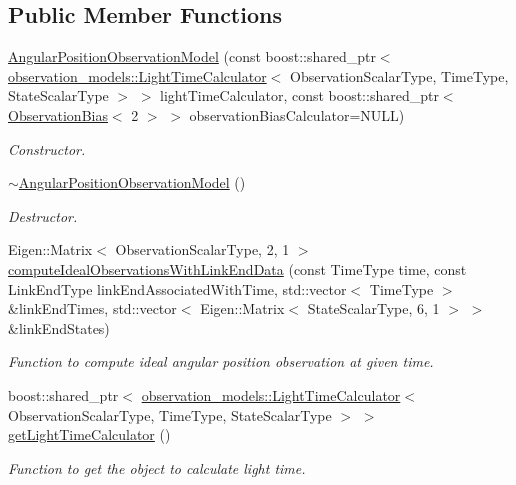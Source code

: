 \subsection*{Public Member Functions}
\begin{DoxyCompactItemize}
\item 
\hyperlink{classtudat_1_1observation__models_1_1AngularPositionObservationModel_a3dfdd52bff8293d3602317aff1ee5820}{Angular\+Position\+Observation\+Model} (const boost\+::shared\+\_\+ptr$<$ \hyperlink{classtudat_1_1observation__models_1_1LightTimeCalculator}{observation\+\_\+models\+::\+Light\+Time\+Calculator}$<$ Observation\+Scalar\+Type, Time\+Type, State\+Scalar\+Type $>$ $>$ light\+Time\+Calculator, const boost\+::shared\+\_\+ptr$<$ \hyperlink{classtudat_1_1observation__models_1_1ObservationBias}{Observation\+Bias}$<$ 2 $>$ $>$ observation\+Bias\+Calculator=N\+U\+LL)
\begin{DoxyCompactList}\small\item\em Constructor. \end{DoxyCompactList}\item 
\hyperlink{classtudat_1_1observation__models_1_1AngularPositionObservationModel_a62b5b033b307771a9357fecf04288e52}{$\sim$\+Angular\+Position\+Observation\+Model} ()\hypertarget{classtudat_1_1observation__models_1_1AngularPositionObservationModel_a62b5b033b307771a9357fecf04288e52}{}\label{classtudat_1_1observation__models_1_1AngularPositionObservationModel_a62b5b033b307771a9357fecf04288e52}

\begin{DoxyCompactList}\small\item\em Destructor. \end{DoxyCompactList}\item 
Eigen\+::\+Matrix$<$ Observation\+Scalar\+Type, 2, 1 $>$ \hyperlink{classtudat_1_1observation__models_1_1AngularPositionObservationModel_a8f4020222c0f02173eefddbaac466e07}{compute\+Ideal\+Observations\+With\+Link\+End\+Data} (const Time\+Type time, const Link\+End\+Type link\+End\+Associated\+With\+Time, std\+::vector$<$ Time\+Type $>$ \&link\+End\+Times, std\+::vector$<$ Eigen\+::\+Matrix$<$ State\+Scalar\+Type, 6, 1 $>$ $>$ \&link\+End\+States)
\begin{DoxyCompactList}\small\item\em Function to compute ideal angular position observation at given time. \end{DoxyCompactList}\item 
boost\+::shared\+\_\+ptr$<$ \hyperlink{classtudat_1_1observation__models_1_1LightTimeCalculator}{observation\+\_\+models\+::\+Light\+Time\+Calculator}$<$ Observation\+Scalar\+Type, Time\+Type, State\+Scalar\+Type $>$ $>$ \hyperlink{classtudat_1_1observation__models_1_1AngularPositionObservationModel_a031c5cc789cd43b703d16930eab8c550}{get\+Light\+Time\+Calculator} ()
\begin{DoxyCompactList}\small\item\em Function to get the object to calculate light time. \end{DoxyCompactList}\end{DoxyCompactItemize}
